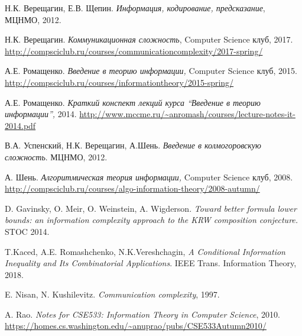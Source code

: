 \documentclass[12pt]{article}
\theoremstyle{definition}
\theoremstyle{plain}
\theoremstyle{remark}
\begin{document}
\begin{thebibliography}{9}
     Н.К. Верещагин, Е.В. Щепин. \emph{Информация, кодирование, предсказание}, МЦНМО, 2012.

     Н.К. Верещагин. \emph{Коммуникационная сложность}, Computer Science клуб, 2017.
        \url{http://compsciclub.ru/courses/communicationcomplexity/2017-spring/}

     А.Е. Ромащенко. \emph{Введение в теорию информации,} Computer Science клуб, 2015. 
        \url{http://compsciclub.ru/courses/informationtheory/2015-spring/}

     А.Е. Ромащенко. \emph{Краткий конспект лекций курса ``Введение в теорию информации'',} 2014. 
        \url{http://www.mccme.ru/~anromash/courses/lecture-notes-it-2014.pdf}

     В.А. Успенский, Н.К. Верещагин, А.Шень. \emph{Введение в колмогоровскую сложность}. МЦНМО, 2012.

     А. Шень. \emph{Алгоритмическая теория информации,} Computer Science клуб, 2008. 
        \url{http://compsciclub.ru/courses/algo-information-theory/2008-autumn/}

     D. Gavinsky, O. Meir, O. Weinstein, A. Wigderson. \emph{Toward better formula lower bounds: 
    an information complexity approach to the KRW composition conjecture.} STOC 2014.

     T.Kaced, A.E. Romashchenko, N.K.Vereshchagin, \emph{A Conditional Information Inequality and Its Combinatorial Applications}.
    {{IEEE} Trans. Information Theory}, 2018.

     E. Nisan, N. Kushilevitz. \emph{Communication complexity}, 1997.

	 A. Rao. \emph{Notes for CSE533: Information Theory in Computer Science}, 2010. \\ \url{https://homes.cs.washington.edu/~anuprao/pubs/CSE533Autumn2010/}

\end{thebibliography}
\end{document}
